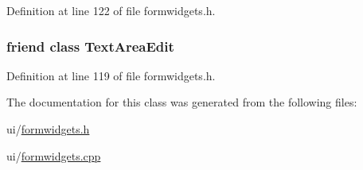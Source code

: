 Definition at line 122 of file formwidgets.\+h.

\hypertarget{classFormWidgetsController_ad511b558249b7566b7cfab76ec967540}{
\subsubsection[{Text\+Area\+Edit}]{\setlength{\rightskip}{0pt plus 5cm}friend class {\bf Text\+Area\+Edit}\hspace{0.3cm}{\ttfamily [friend]}}}\label{classFormWidgetsController_ad511b558249b7566b7cfab76ec967540}


Definition at line 119 of file formwidgets.\+h.



The documentation for this class was generated from the following files\+:\begin{DoxyCompactItemize}
\item 
ui/\hyperlink{formwidgets_8h}{formwidgets.\+h}\item 
ui/\hyperlink{formwidgets_8cpp}{formwidgets.\+cpp}\end{DoxyCompactItemize}
